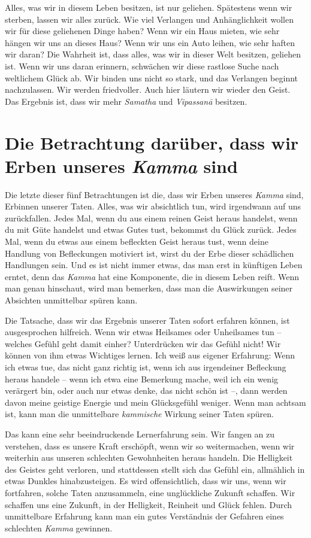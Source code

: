 \documentclass[12pt,openany]{book}
\begin{document}
Alles, was wir in diesem Leben besitzen, ist nur geliehen. Spätestens wenn wir sterben, lassen wir alles zurück. Wie viel Verlangen und Anhänglichkeit wollen wir für diese geliehenen Dinge haben? Wenn wir ein Haus mieten, wie sehr hängen wir uns an dieses Haus? Wenn wir uns ein Auto leihen, wie sehr haften wir daran? Die Wahrheit ist, dass alles, was wir in dieser Welt besitzen, geliehen ist. Wenn wir uns daran erinnern, schwächen wir diese rastlose Suche nach weltlichem Glück ab. Wir binden uns nicht so stark, und das Verlangen beginnt nachzulassen. Wir werden friedvoller. Auch hier läutern wir wieder den Geist. Das Ergebnis ist, dass wir mehr \textit{Samatha} und \textit{Vipas\-sanā} besitzen.

\section*{Die Betrachtung da\-rüber, dass wir Erben unseres \textit{Kamma} sind}

Die letzte dieser fünf Betrachtungen ist die, dass wir Erben unseres \textit{Kamma} sind, Erbinnen unserer Taten. Alles, was wir absichtlich tun, wird irgendwann auf uns zurückfallen. Jedes Mal, wenn du aus einem reinen Geist heraus handelst, wenn du mit Güte handelst und etwas Gutes tust, bekommst du Glück zurück. Jedes Mal, wenn du etwas aus einem befleckten Geist heraus tust, wenn deine Handlung von Befleckungen motiviert ist, wirst du der Erbe dieser schädlichen Handlungen sein. Und es ist nicht immer etwas, das man erst in künftigen Leben erntet, denn das \textit{Kamma} hat eine Komponente, die in diesem Leben reift. Wenn man genau hinschaut, wird man bemerken, dass man die Auswirkungen seiner Absichten unmittelbar spüren kann.

Die Tatsache, dass wir das Ergebnis unserer Taten sofort erfahren können, ist ausgesprochen hilfreich. Wenn wir etwas Heilsames oder Unheilsames tun – welches Gefühl geht damit einher? Unterdrücken wir das Gefühl nicht! Wir können von ihm etwas Wichtiges lernen. Ich weiß aus eigener Erfahrung: Wenn ich etwas tue, das nicht ganz richtig ist, wenn ich aus irgendeiner Befleckung heraus handele – wenn ich etwa eine Bemerkung mache, weil ich ein wenig verärgert bin, oder auch nur etwas denke, das nicht schön ist –, dann werden davon meine geistige Energie und mein Glücksgefühl weniger. Wenn man achtsam ist, kann man die unmittelbare \textit{kammische} Wirkung seiner Taten spüren.

Das kann eine sehr beeindruckende Lernerfahrung sein. Wir fangen an zu verstehen, dass es unsere Kraft erschöpft, wenn wir so weitermachen, wenn wir weiterhin aus unseren schlechten Gewohnheiten heraus handeln. Die Helligkeit des Geistes geht verloren, und stattdessen stellt sich das Gefühl ein, allmählich in etwas Dunkles hinabzusteigen. Es wird offensichtlich, dass wir uns, wenn wir fortfahren, solche Taten anzusammeln, eine unglückliche Zukunft schaffen. Wir schaffen uns eine Zukunft, in der Helligkeit, Reinheit und Glück fehlen. Durch unmittelbare Erfahrung kann man ein gutes Verständnis der Gefahren eines schlechten \textit{Kamma} gewinnen.
\end{document}
